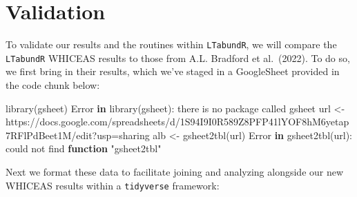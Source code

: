 \documentclass[
]{book}
\newenvironment{Shaded}{\begin{snugshade}}{\end{snugshade}}
\newcommand{\ControlFlowTok}[1]{\textcolor[rgb]{0.13,0.29,0.53}{\textbf{#1}}}
\newcommand{\FunctionTok}[1]{\textcolor[rgb]{0.00,0.00,0.00}{#1}}
\newcommand{\NormalTok}[1]{#1}
\newcommand{\OtherTok}[1]{\textcolor[rgb]{0.56,0.35,0.01}{#1}}
\newcommand{\SpecialCharTok}[1]{\textcolor[rgb]{0.00,0.00,0.00}{#1}}
\newcommand{\StringTok}[1]{\textcolor[rgb]{0.31,0.60,0.02}{#1}}
\begin{document}
\hypertarget{validation-1}{%
\section*{Validation}\label{validation-1}}

To validate our results and the routines within \texttt{LTabundR}, we will compare the \texttt{LTabundR} WHICEAS results to those from A.L. Bradford et al.~(2022). To do so, we first bring in their results, which we've staged in a GoogleSheet provided in the code chunk below:

\begin{Shaded}
\begin{Highlighting}[]
\FunctionTok{library}\NormalTok{(gsheet)}
\NormalTok{Error }\ControlFlowTok{in} \FunctionTok{library}\NormalTok{(gsheet)}\SpecialCharTok{:}\NormalTok{ there is no package called }\StringTok{\textquotesingle{}gsheet\textquotesingle{}}
\NormalTok{url }\OtherTok{\textless{}{-}} \StringTok{\textquotesingle{}https://docs.google.com/spreadsheets/d/1S94I9I0R589Z8PFP41lYOF8hM6yetap7RFlPdBeet1M/edit?usp=sharing\textquotesingle{}}
\NormalTok{alb }\OtherTok{\textless{}{-}} \FunctionTok{gsheet2tbl}\NormalTok{(url)}
\NormalTok{Error }\ControlFlowTok{in} \FunctionTok{gsheet2tbl}\NormalTok{(url)}\SpecialCharTok{:}\NormalTok{ could not find }\ControlFlowTok{function} \StringTok{"gsheet2tbl"}
\end{Highlighting}
\end{Shaded}

Next we format these data to facilitate joining and analyzing alongside our new WHICEAS results within a \texttt{tidyverse} framework:
\end{document}
